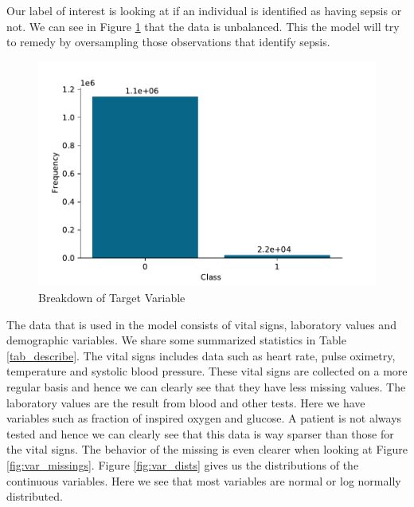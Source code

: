 \documentclass[10pt,letterpaper]{article}
\begin{document}
\par Our label of interest is looking at if an individual is identified as having sepsis or not. We can see in Figure \ref{fig:label_dist} that the data is unbalanced. This the model will try to remedy by oversampling those observations that identify sepsis.

\begin{figure}[htbp!]
    \centering
    \includegraphics[scale = 0.7]{Label_dist.pdf}
    \caption{Breakdown of Target Variable}
    \label{fig:label_dist}
\end{figure}

\par The data that is used in the model consists of vital signs, laboratory values and demographic variables. We share some summarized statistics in Table \ref{tab_describe}. The vital signs includes data such as heart rate, pulse oximetry, temperature and systolic blood pressure. These vital signs are collected on a more regular basis and hence we can clearly see that they have less missing values. The laboratory values are the result from blood and other tests. Here we have variables such as fraction of inspired oxygen and glucose. A patient is not always tested and hence we can clearly see that this data is way sparser than those for the vital signs. The behavior of the missing is even clearer when looking at Figure \ref{fig:var_missings}. Figure \ref{fig:var_dists} gives us the distributions of the continuous variables. Here we see that most variables are normal or log normally distributed. 

\end{document}
